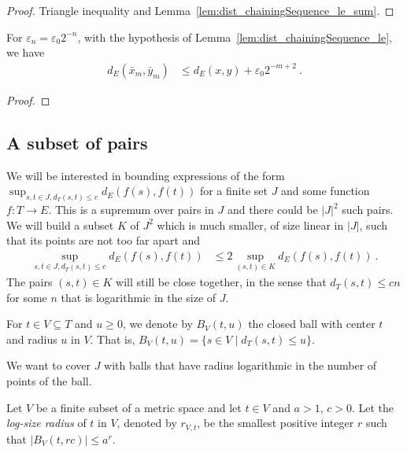 \begin{proof}\leanok
Triangle inequality and Lemma~\ref{lem:dist_chainingSequence_le_sum}.
\end{proof}


\begin{corollary}\label{cor:dist_chainingSequence_pow_two_le}
  \leanok
For $\varepsilon_n = \varepsilon_0 2^{-n}$, with the hypothesis of Lemma~\ref{lem:dist_chainingSequence_le}, we have
\begin{align*}
  d_E(\bar{x}_m, \bar{y}_m)
  &\le d_E(x, y) + \varepsilon_0 2^{-m+2}
  \: .
\end{align*}
\end{corollary}

\begin{proof}\leanok

\end{proof}


\subsection{A subset of pairs}

We will be interested in bounding expressions of the form $\sup_{s,t\in J, d_T(s,t) \le c} d_E(f(s), f(t))$ for a finite set $J$ and some function $f : T \to E$.
This is a supremum over pairs in $J$ and there could be $\vert J \vert^2$ such pairs.
We will build a subset $K$ of $J^2$ which is much smaller, of size linear in $\vert J \vert$, such that its points are not too far apart and
\begin{align*}
  \sup_{s,t\in J, d_T(s,t) \le c} d_E(f(s), f(t))
  & \le 2 \sup_{(s,t) \in K} d_E(f(s), f(t))
  \: .
\end{align*}
The pairs $(s, t) \in K$ will still be close together, in the sense that $d_T(s, t) \le c n$ for some $n$ that is logarithmic in the size of $J$.

For $t \in V \subseteq T$ and $u\ge 0$, we denote by $B_V(t, u)$ the closed ball with center $t$ and radius $u$ in $V$.
That is, $B_V(t, u) = \{s \in V \mid d_T(s, t) \le u\}$.

We want to cover $J$ with balls that have radius logarithmic in the number of points of the ball.

\begin{definition}\label{def:logSizeRadius}
  \leanok
Let $V$ be a finite subset of a metric space and let $t \in V$ and $a > 1$, $c > 0$.
Let the \emph{log-size radius} of $t$ in $V$, denoted by $r_{V,t}$, be the smallest positive integer $r$ such that $\vert B_V(t, r c) \vert \le a^{r}$.
\end{definition}


